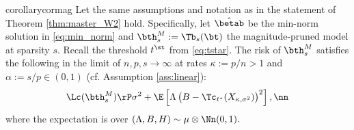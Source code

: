{\begin{restatable}{corollary}{cormag}\label{cor:mag}
Let the same assumptions and notation as in the statement of Theorem \ref{thm:master_W2} hold. Specifically, let $\hat\betab$ be the min-norm solution in \eqref{eq:min_norm} and $\bth_s^M:=\Tb_s(\bt)$ the magnitude-pruned model at sparsity $s$. Recall the threshold $t^\st$ from \eqref{eq:tstar}. The risk of $\bth^M_s$ satisfies the following in the limit of $n,p,s\rightarrow\infty$ at rates $\kappa:=p/n>1$ and $\alpha:=s/p\in(0,1)$ (cf. Assumption \ref{ass:linear}):
\begin{align}
\Lc(\bth^M_s) \rP \sigma^2 + \E\left[ \Lambda\left(B-\Tc_{t^\star}(X_{\kappa,\sigma^2})\right)^2 \right],\nn
\end{align}
where the expectation is over $(\Lambda,B,H)\sim\mu\otimes\Nn(0,1).$
\end{restatable}}

